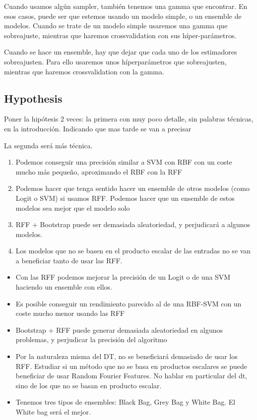 Cuando usamos algún sampler, también tenemos una gamma que encontrar. En esos
casos, puede ser que estemos usando un modelo simple, o un ensemble de modelos.
Cuando se trate de un modelo simple usaremos una gamma que sobreajuste, mientras
que haremos crossvalidation con sus híper-parámetros.

Cuando se hace un ensemble, hay que dejar que cada uno de los estimadores
sobreajusten. Para ello usaremos unos híperparámetros que sobreajusten, mientras
que haremos crossvalidation con la gamma.

\subsection{Hypothesis}

Poner la hipótesis 2 veces: la primera con muy poco detalle, sin palabras
técnicas, en la introducción. Indicando que mas tarde se van a precisar

La segunda será más técnica.

\begin{note}
  \begin{enumerate}
    \item Podemos conseguir una precisión similar a SVM con RBF con un coste
    mucho más pequeño, aproximando el RBF con la RFF
    \item Podemos hacer que tenga sentido hacer un ensemble de otros modelos
    (como Logit o SVM) si usamos RFF. Podemos hacer que un ensemble de estos
    modelos sea mejor que el modelo solo
    \item RFF + Bootstrap puede ser demasiada aleatoriedad, y perjudicará a algunos
    modelos.
    \item Los modelos que no se basen en el producto escalar de las entradas no
    se van a beneficiar tanto de usar las RFF.
  \end{enumerate}
\end{note}

\begin{itemize}
  \item Con las RFF podemos mejorar la precisión de un Logit o de una SVM
  haciendo un ensemble con ellos.
  \item Es posible conseguir un rendimiento parecido al de una RBF-SVM con
  un coste mucho menor usando las RFF
  \item Bootstrap + RFF puede generar demasiada aleatoriedad en algunos
  problemas, y perjudicar la precisión del algoritmo
  \item Por la naturaleza misma del DT, no se beneficiará demasiado de usar los
  RFF. Estudiar si un método que no se basa en productos escalares se puede
  beneficiar de usar Random Fourier Features. No hablar en particular del dt,
  sino de los que no se basan en producto escalar.
  \item Tenemos tres tipos de ensembles: Black Bag, Grey Bag y White Bag. El
  White bag será el mejor.
\end{itemize}


